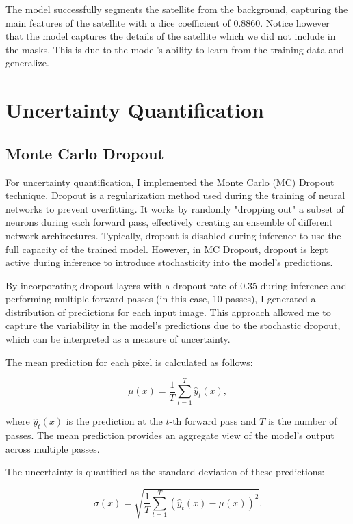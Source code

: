 \documentclass{article}
\begin{document}
The model successfully segments the satellite from the background, capturing the main features of the satellite
with a dice coefficient of 0.8860. Notice however that the model captures the details of the satellite which we 
did not include in the masks. This is due to the model's ability to learn from the training data and generalize.

\section{Uncertainty Quantification}
\subsection{Monte Carlo Dropout}

For uncertainty quantification, I implemented the Monte Carlo (MC) Dropout technique. Dropout is a regularization method 
used during the training of neural networks to prevent overfitting. It works by randomly "dropping out" a subset of neurons 
during each forward pass, effectively creating an ensemble of different network architectures. Typically, dropout is 
disabled during inference to use the full capacity of the trained model. However, in MC Dropout, dropout is kept active 
during inference to introduce stochasticity into the model's predictions.

By incorporating dropout layers with a dropout rate of 0.35 during inference and performing multiple forward passes 
(in this case, 10 passes), I generated a distribution of predictions for each input image. This approach allowed me to 
capture the variability in the model's predictions due to the stochastic dropout, which can be interpreted as a measure of 
uncertainty.

The mean prediction for each pixel is calculated as follows:

\[
\mu(x) = \frac{1}{T} \sum_{t=1}^{T} \hat{y}_t(x),
\]

where \( \hat{y}_t(x) \) is the prediction at the \( t \)-th forward pass and \( T \) is the number of passes. The mean 
prediction provides an aggregate view of the model's output across multiple passes.

The uncertainty is quantified as the standard deviation of these predictions:

\[
\sigma(x) = \sqrt{\frac{1}{T} \sum_{t=1}^{T} (\hat{y}_t(x) - \mu(x))^2}.
\]
\end{document}
